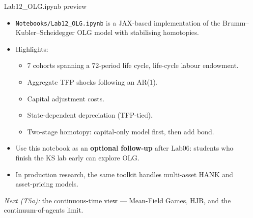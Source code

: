\begin{frame}{Lab12\_OLG.ipynb preview}
\begin{itemize}
\item \texttt{Notebooks/Lab12\_OLG.ipynb} is a JAX-based implementation of the Brumm--Kubler--Scheidegger OLG model with stabilising homotopies.
\medskip
\item Highlights:
  \begin{itemize}
  \item 7 cohorts spanning a 72-period life cycle, life-cycle labour endowment.
  \item Aggregate TFP shocks following an AR(1).
  \item Capital adjustment costs.
  \item State-dependent depreciation (TFP-tied).
  \item Two-stage homotopy: capital-only model first, then add bond.
  \end{itemize}
\medskip
\item Use this notebook as an \textbf{optional follow-up} after Lab06: students who finish the KS lab early can explore OLG.
\medskip
\item In production research, the same toolkit handles multi-asset HANK and asset-pricing models.
\end{itemize}
\medskip
\emph{Next (T5a):} the continuous-time view --- Mean-Field Games, HJB, and the continuum-of-agents limit.
\end{frame}


